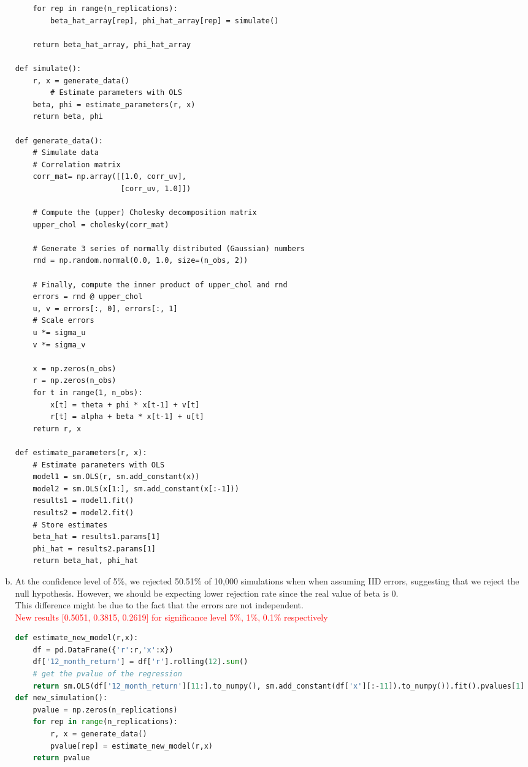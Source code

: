 \begin{enumerate}[(a)]
\begin{lstlisting}
    for rep in range(n_replications):
        beta_hat_array[rep], phi_hat_array[rep] = simulate()

    return beta_hat_array, phi_hat_array

def simulate():
    r, x = generate_data()
        # Estimate parameters with OLS
    beta, phi = estimate_parameters(r, x)
    return beta, phi

def generate_data():
    # Simulate data
    # Correlation matrix
    corr_mat= np.array([[1.0, corr_uv],
                        [corr_uv, 1.0]])

    # Compute the (upper) Cholesky decomposition matrix
    upper_chol = cholesky(corr_mat)

    # Generate 3 series of normally distributed (Gaussian) numbers
    rnd = np.random.normal(0.0, 1.0, size=(n_obs, 2))

    # Finally, compute the inner product of upper_chol and rnd
    errors = rnd @ upper_chol
    u, v = errors[:, 0], errors[:, 1]
    # Scale errors
    u *= sigma_u
    v *= sigma_v 

    x = np.zeros(n_obs)
    r = np.zeros(n_obs)
    for t in range(1, n_obs):
        x[t] = theta + phi * x[t-1] + v[t]
        r[t] = alpha + beta * x[t-1] + u[t]
    return r, x

def estimate_parameters(r, x):
    # Estimate parameters with OLS
    model1 = sm.OLS(r, sm.add_constant(x))
    model2 = sm.OLS(x[1:], sm.add_constant(x[:-1]))
    results1 = model1.fit()
    results2 = model2.fit()
    # Store estimates
    beta_hat = results1.params[1]
    phi_hat = results2.params[1]
    return beta_hat, phi_hat
\end{lstlisting}
\item 
At the confidence level of 5\%, we rejected 50.51\% of 10,000 simulations when when assuming IID errors, 
suggesting that we reject the null hypothesis. 
However, we should be expecting lower rejection rate since the real value of beta is 0.\\
This difference might be due to the fact that the errors are not independent.\\
 \textcolor{red}{New results [0.5051, 0.3815, 0.2619] for significance level 5\%, 1\%, 0.1\% respectively}

\begin{lstlisting}[language=Python, caption=Python code for new model, label={lst:q1a}, escapechar=|, frame=single, basicstyle=\small, showstringspaces=false, captionpos=b, breaklines=true, showspaces=false, showtabs=false, keywordstyle=\color{blue}, commentstyle=\color{gray}]
    def estimate_new_model(r,x):
    df = pd.DataFrame({'r':r,'x':x})
    df['12_month_return'] = df['r'].rolling(12).sum()
    # get the pvalue of the regression
    return sm.OLS(df['12_month_return'][11:].to_numpy(), sm.add_constant(df['x'][:-11]).to_numpy()).fit().pvalues[1]
def new_simulation():
    pvalue = np.zeros(n_replications)
    for rep in range(n_replications):
        r, x = generate_data()
        pvalue[rep] = estimate_new_model(r,x)
    return pvalue
    \end{lstlisting}


\end{enumerate}
